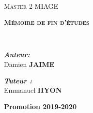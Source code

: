 \begin{titlepage}
\begin{center}

\setlength{\parindent}{0pt}

~\\[1cm]


\textsc{\Huge Master 2 MIAGE}\\[0.5cm]

\vspace{5mm}

\textsc{\huge \bfseries  Mémoire de fin d'études}\\[1.5cm]



\HRule

{\huge \bfseries \thetitle \\[0.4cm] }


\HRule

\vspace{5mm}

\begin{minipage}{0.4\textwidth}
\begin{flushleft} \large
\emph{\textbf{Auteur:}}\\
Damien \textsc{\textbf{JAIME}}
\end{flushleft}
\end{minipage}
\begin{minipage}{0.4\textwidth}
\begin{flushright} \large
\emph{\textbf{Tuteur :}} \\
Emmanuel \textsc{\textbf{HYON}}
\end{flushright}
\end{minipage}

\vfill

{\huge \bfseries Promotion 2019-2020}

\end{center}
\end{titlepage}